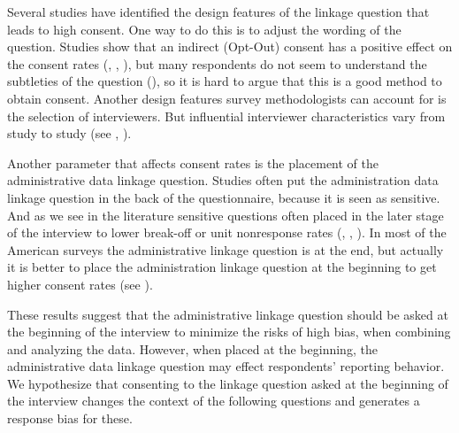 

Several studies have identified the design features of the linkage question that leads to high consent. One way to do this is to adjust the wording of the question. Studies show that an indirect (Opt-Out) consent has a positive effect on the consent rates (\cite{Bates05}, \cite{Pascale11}, \cite{Dasetal14}), but many respondents do not seem to understand the subtleties of the question (\cite{Bates05}), so it is hard to argue that this is a good method to obtain consent. Another design features survey methodologists can account for is the selection of interviewers. But influential interviewer characteristics vary from study to study (see \cite{Beste11}, \cite{Sakshaugetal13} \cite{Salaetal10}).


Another parameter that affects consent rates is the placement of the administrative data linkage question. Studies often put the administration data linkage question in the back of the questionnaire, because it is seen as sensitive. And as we see in the literature sensitive questions often placed in the later stage of the interview to lower break-off or unit nonresponse rates (\cite{Cantoretal02}, \cite{Sudmanetal82}, \cite{Tourangeauetal07}). In most of the American surveys the administrative linkage question is at the end, but actually it is better to place the administration linkage question at the beginning to get higher consent rates (see \cite{Sakshaugetal13}).

These results suggest that the administrative linkage question should be asked at the beginning of the interview to minimize the risks of high bias, when combining and analyzing the data. However, when placed at the beginning, the administrative data linkage question may effect respondents' reporting behavior. We hypothesize that consenting to the linkage question asked at the beginning of the interview changes the context of the following questions and generates a response bias for these.

